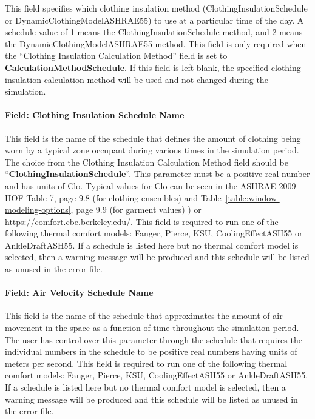 This field specifies which clothing insulation method (ClothingInsulationSchedule or DynamicClothingModelASHRAE55) to use at a particular time of the day. A schedule value of 1 means the ClothingInsulationSchedule method, and 2 means the DynamicClothingModelASHRAE55 method. This field is only required when the ``Clothing Insulation Calculation Method'' field is set to \textbf{CalculationMethodSchedule}. If this field is left blank, the specified clothing insulation calculation method will be used and not changed during the simulation.

\paragraph{Field: Clothing Insulation Schedule Name}\label{field-clothing-insulation-schedule-name-people-instance}

This field is the name of the schedule that defines the amount of clothing being worn by a typical zone occupant during various times in the simulation period. The choice from the Clothing Insulation Calculation Method field should be ``\textbf{ClothingInsulationSchedule}''. This parameter must be a positive real number and has units of Clo. Typical values for Clo can be seen in the ASHRAE 2009 HOF Table 7, page 9.8 (for clothing ensembles) and Table~\ref{table:window-modeling-options}, page 9.9 (for garment values) ) or \url{https://comfort.cbe.berkeley.edu/}. This field is required to run one of the following thermal comfort models: Fanger, Pierce, KSU, CoolingEffectASH55 or AnkleDraftASH55. If a schedule is listed here but no thermal comfort model is selected, then a warning message will be produced and this schedule will be listed as unused in the error file.

\paragraph{Field: Air Velocity Schedule Name}\label{field-air-velocity-schedule-name-people-instance}

This field is the name of the schedule that approximates the amount of air movement in the space as a function of time throughout the simulation period. The user has control over this parameter through the schedule that requires the individual numbers in the schedule to be positive real numbers having units of meters per second. This field is required to run one of the following thermal comfort models: Fanger, Pierce, KSU, CoolingEffectASH55 or AnkleDraftASH55. If a schedule is listed here but no thermal comfort model is selected, then a warning message will be produced and this schedule will be listed as unused in the error file.

